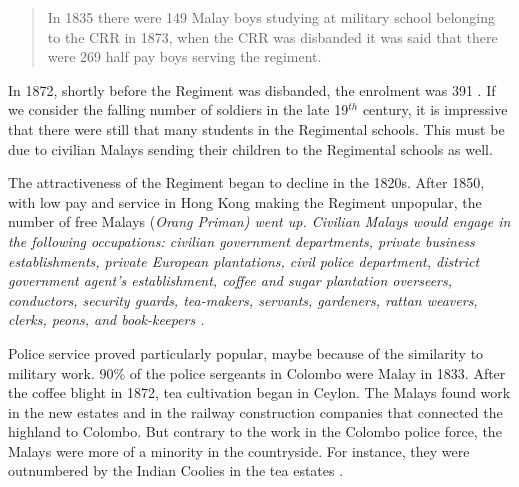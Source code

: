 \begin{quote}
In 1835 there were 149 Malay boys studying at military school belonging to the CRR \el in 1873, when the CRR was disbanded it was said that there were 269 half pay boys serving the regiment. \citep[97]{Hussainmiya1990}
\end{quote}

In 1872, shortly before the Regiment was disbanded, the enrolment was 391 \citep[17]{Bichsel}. If we consider the falling number of soldiers in the late 19$^{th}$ century, it is impressive that there were still that many students in the Regimental schools. This must be due to civilian Malays sending their children to the Regimental schools as well.

%


The attractiveness of the Regiment began to decline in the 1820s.
After 1850, with low pay and service in Hong Kong making the
Regiment unpopular, the number of free Malays (\em Orang
Priman\em) went up.  
Civilian Malays would engage in the following occupations:
      civilian government departments,
      private business establishments,
      private European plantations,
      civil police department,
      district government agent's establishment,
      coffee and sugar plantation overseers, conductors, security guards, tea-makers,
      servants,
      gardeners,
      rattan weavers,
      clerks,
      peons, and 
      book-keepers  \citep[90]{Hussainmiya1990}. 

Police service proved particularly popular, maybe because of the
similarity to military work. 90\% of the police sergeants in
Colombo were Malay in 1833. After the coffee blight in 1872,
tea cultivation began in Ceylon.   The Malays found work in the
new estates and in the railway construction companies that
connected the highland to Colombo. But contrary to the work in the
Colombo police force, the Malays were more of a minority in the
countryside. For instance, they were outnumbered by the Indian
Coolies in the tea estates \citep[90f]{Hussainmiya1990}.



